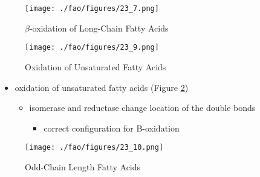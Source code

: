 \documentclass{scrartcl}
\begin{document}
\begin{figure}[htbp]
\centering
\texttt{[image: ./fao/figures/23\_7.png]}
\caption{\label{fig:org4b6cc69}
\(\beta\)-oxidation of Long-Chain Fatty Acids}
\end{figure}


\begin{figure}[htbp]
\centering
\texttt{[image: ./fao/figures/23\_9.png]}
\caption{\label{fig:orga3ff557}
Oxidation of Unsaturated Fatty Acids}
\end{figure}

\begin{itemize}
\item oxidation of unsaturated fatty acids (Figure \ref{fig:orga3ff557})
\begin{itemize}
\item isomerase and reductase change location of the double bonds
\begin{itemize}
\item correct configuration for B-oxidation
\end{itemize}
\end{itemize}
\end{itemize}
\begin{figure}[htbp]
\centering
\texttt{[image: ./fao/figures/23\_10.png]}
\caption{\label{fig:org1332b31}
Odd-Chain Length Fatty Acids}
\end{figure}
\end{document}

